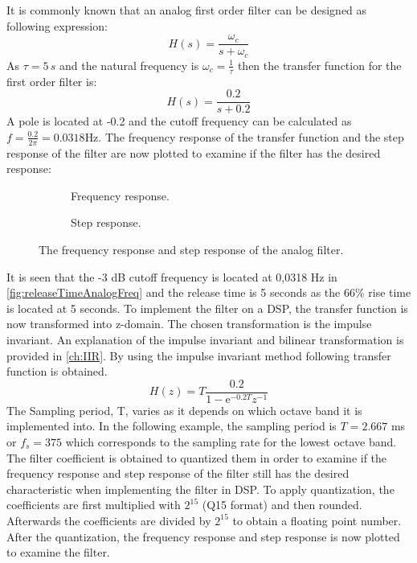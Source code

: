 It is commonly known that an analog first order filter can be designed as following expression:
\begin{equation}
H(s) = \frac{\omega_c}{s+\omega_c}
\end{equation}
As $\tau = 5\, s$ and the natural frequency is $\omega_c = \frac{1}{\tau}$ then the transfer function for the first order filter is:
\begin{equation}
H(s) = \frac{0.2}{s+0.2}
\end{equation} 
A pole is located at -0.2 and the cutoff frequency can be calculated as $f = \frac{0.2}{2\pi} = 0.0318 \text{Hz}$. The frequency response of the transfer function and the step response of the filter are now plotted to examine if the filter has the desired response:

\begin{figure}[H]
\centering
\begin{subfigure}[t]{0.7\textwidth}
	
	\caption{Frequency response.}
	\label{fig:releaseTimeAnalogFreq}
\end{subfigure}
\begin{subfigure}[t]{0.7\textwidth}
	
	\caption{Step response.}
	\label{fig:releaseTimeAnalogStep}
\end{subfigure}
\caption{The frequency response and step response of the analog filter.}
\label{fig:releaseTimeAnalog}
\end{figure}

It is seen that the -3 dB cutoff frequency is located at 0,0318 Hz in \autoref{fig:releaseTimeAnalogFreq} and the release time is 5 seconds as the 66\% rise time is located at 5 seconds. To implement the filter on a DSP, the transfer function is now transformed into z-domain. The chosen transformation is the impulse invariant. An explanation of the impulse invariant and bilinear transformation is provided in \autoref{ch:IIR}. By using the impulse invariant method following transfer function is obtained.
\begin{equation} \label{eq:releaseTF}
H(z) = T\frac{0.2}{1-\text{e}^{-0.2T} z^{-1}}
\end{equation} 
The Sampling period, T, varies as it depends on which octave band it is implemented into. In the following example, the sampling period is $T = 2.667$ ms or $f_s = 375$ which corresponds to the sampling rate for the lowest octave band. The filter coefficient is obtained to quantized them in order to examine if the frequency response and step response of the filter still has the desired characteristic when implementing the filter in DSP. To apply quantization, the coefficients are first multiplied with $2^{15}$ (Q15 format) and then rounded. Afterwards the coefficients are divided by $2^{15}$ to obtain a floating point number. After the quantization, the frequency response and step response is now plotted to examine the filter.

